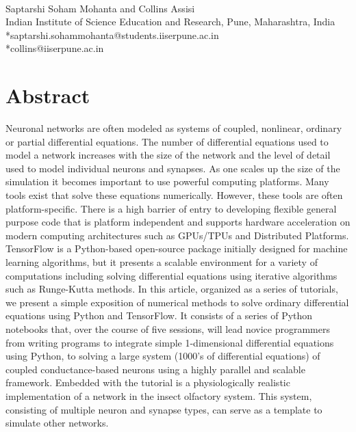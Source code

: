 \documentclass[10pt,letterpaper]{article}
\begin{document}
\vspace*{0.2in}

\begin{flushleft}
{\Large
\textbf{} %
}\\
Saptarshi Soham Mohanta and Collins Assisi
\bigskip
\\
Indian Institute of Science Education and Research, Pune, Maharashtra, India\\
\bigskip
*saptarshi.sohammohanta@students.iiserpune.ac.in \\
*collins@iiserpune.ac.in

\end{flushleft}
\section*{Abstract}
Neuronal networks are often modeled as systems of coupled, nonlinear, ordinary or
partial differential equations. The number of differential equations used to model a
network increases with the size of the network and the level of detail used to model
individual neurons and synapses. As one scales up the size of the simulation it becomes important to use powerful computing platforms. Many tools exist that solve these equations numerically. However, these tools are often platform-specific. There is a high barrier of entry to developing flexible general purpose code that is platform independent and supports hardware acceleration on modern computing architectures such as GPUs/TPUs and Distributed Platforms. TensorFlow is a Python-based open-source package initially designed for machine learning algorithms, but it presents a scalable environment for a variety of computations including solving differential equations using iterative algorithms such as Runge-Kutta methods. In this article, organized as a series of tutorials, we present a simple exposition of numerical methods to solve ordinary differential equations using Python and TensorFlow. It consists of a series of Python notebooks that, over the course of five sessions, will lead novice programmers from writing programs to integrate simple 1-dimensional differential equations using Python, to solving a large system (1000’s of differential equations) of coupled conductance-based neurons using a highly parallel and scalable framework. Embedded with the tutorial is a physiologically realistic implementation of a network in the insect olfactory system. This system, consisting of multiple neuron and synapse types, can serve as a template to simulate other networks.
\end{document}
